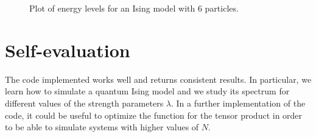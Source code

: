 \documentclass[rmp,10pt,onecolumn,fleqn,notitlepage]{revtex4-1}
\begin{document}
\begin{figure}[h!]
\begin{minipage}[c]{0.49\linewidth}
\end{minipage}
\begin{minipage}[]{0.49\linewidth}
\centering
{}
\end{minipage}
\caption{\label{fig:results_6} Plot of energy levels for an Ising model with 6 particles. }
\end{figure}

\section{Self-evaluation}
The code implemented works well and returns consistent results. In particular, we learn how to simulate a quantum Ising model and we study its spectrum for different values of the strength parameters \( \lambda  \).
In a further implementation of the code, it could be useful to optimize the function for the tensor product in order to be able to simulate systems with higher values of \( N \).
\end{document}
